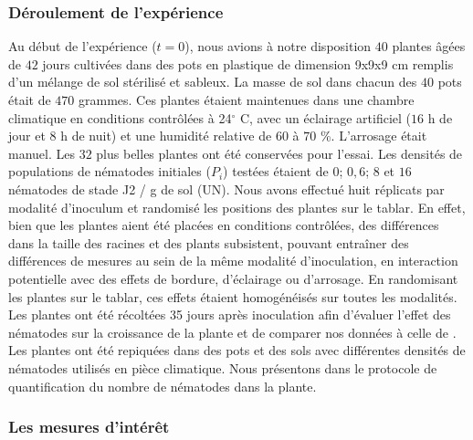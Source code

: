 	
\subsubsection{Déroulement de l'expérience}
	Au début de l'expérience ($t=0$), nous avions à notre disposition $40$ plantes âgées de $42$ jours cultivées dans des  pots en plastique de dimension 9x9x9 cm  remplis d'un mélange de
sol stérilisé et sableux. La masse de sol dans chacun des $40$ pots   était de $470$ grammes.  
Ces plantes étaient maintenues dans une chambre climatique  en conditions contrôlées  à  
24$^{\circ}$ C, avec un éclairage artificiel ($16$ h de jour et 8 h de nuit) et une humidité relative de $60$ à $70$ \%.  L’arrosage était manuel. 
Les $32$ plus belles plantes ont été conservées pour l'essai.
Les densités de populations de nématodes initiales ($P_i$)  testées étaient de $0$; $0,6$; $8$ et
$16$  nématodes de stade J2 / g de sol (UN).   
Nous avons effectué huit réplicats par modalité d'inoculum et randomisé les positions des plantes sur le tablar.   En effet, bien que les plantes aient été placées en conditions contrôlées, des différences dans la taille des racines et des plants subsistent, pouvant entraîner des différences de mesures au sein de la même modalité d'inoculation, en interaction potentielle avec des effets de bordure, d'éclairage ou d'arrosage. En randomisant les plantes sur le tablar, ces effets étaient homogénéisés sur toutes les modalités. Les plantes  ont été récoltées  35 jours après inoculation afin d'évaluer l'effet des nématodes sur la croissance de la plante et de comparer nos données à celle de \citet{Ehwaeti1998}. Les plantes ont été repiquées dans des pots et des sols avec différentes densités de nématodes utilisés  en pièce climatique.  Nous présentons dans   le protocole de quantification du nombre de nématodes dans la plante. 
	 
	\subsubsection{Les mesures d’intérêt} \label{mesures}
	 
